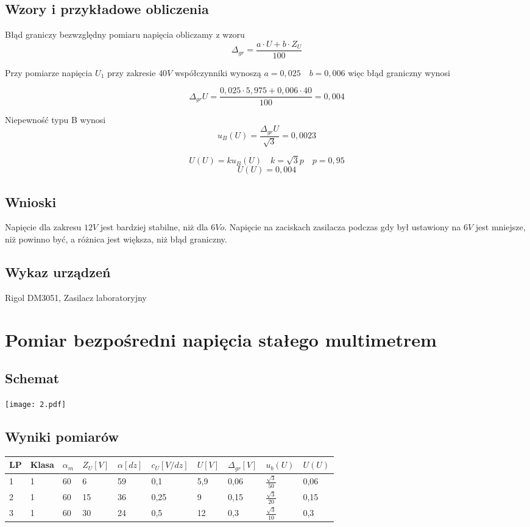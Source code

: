 \documentclass[11pt]{article}
\begin{document}
\subsection{Wzory i przykładowe obliczenia}
Błąd graniczy bezwzględny pomiaru napięcia obliczamy z wzoru $$ \Delta_{gr} = \frac{a \cdot U + b \cdot Z_U}{100} $$

Przy pomiarze napięcia $U_1$ przy zakresie $40V$ współczynniki wynoszą $ a = 0,025 \quad b = 0,006 $ więc błąd graniczny wynosi 

$$ \Delta_{gr}U = \frac{0,025 \cdot 5,975 + 0,006 \cdot 40}{100} = 0,004$$

Niepewność typu B wynosi 
$$ u_B(U) = \frac{\Delta_{gr}U}{\sqrt{3}} = 0,0023$$

$$ U(U) = k u_B(U) \quad k = \sqrt{3}p \quad p = 0,95 $$
$$ U(U) = 0,004 $$

\subsection{Wnioski}
Napięcie dla zakresu $12V$ jest bardziej stabilne, niż dla $6Vo$. Napięcie na zaciskach zasilacza podczas gdy był ustawiony na $6V$ jest mniejsze, niż powinno być, a różnica jest większa, niż błąd graniczny.

\subsection{Wykaz urządzeń}
Rigol DM3051, Zasilacz laboratoryjny

\newpage
\section{Pomiar bezpośredni napięcia stałego multimetrem}

\subsection{Schemat}
\begin{center}
\texttt{[image: 2.pdf]}
\end{center}
\subsection{Wyniki pomiarów}
\begin{center}
\begin{tabular}{|l|l|l|l|l|l|l|l|l|l|}
\hline
	LP & Klasa & $\alpha_m$ & $Z_{U}[V]$ & $\alpha[dz]$ & $c_U[V/dz]$ & $U[V]$ & $\Delta_{gr}[V]$ & $u_b(U)$ & $U(U)$\\
\hline
	1 & 1 & 60 & 6 & 59 & 0,1 & 5,9 & 0,06 & $\frac{\sqrt{3}}{50}$ & 0,06\\
\hline
	2 & 1 & 60 & 15 & 36 & 0,25 & 9 & 0,15 & $\frac{\sqrt{3}}{20}$ & 0,15\\
\hline
	3 & 1 & 60 & 30 & 24 & 0,5 & 12 & 0,3 & $\frac{\sqrt{3}}{10}$ & 0,3 \\
\hline
\end{tabular}
\end{center}
\end{document}
